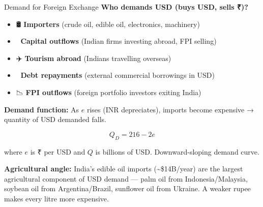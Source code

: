 \documentclass[
  ignorenonframetext,
  aspectratio=169,
]{beamer}
\makeatletter
\providecommand{\tightlist}{%
  \setlength{\itemsep}{0pt}\setlength{\parskip}{0pt}}
\let\quarto@originallabel\label
\DeclareRobustCommand*{\label}[1]{\quarto@originallabel{#1}}
\makeatother
\begin{document}
\begin{frame}{Demand for Foreign Exchange}
\label{demand-for-foreign-exchange}
\textbf{Who demands USD (buys USD, sells ₹)?}

\begin{itemize}
\tightlist
\item
  🛢️ \textbf{Importers} (crude oil, edible oil, electronics, machinery)
\item
  💸 \textbf{Capital outflows} (Indian firms investing abroad, FPI
  selling)
\item
  ✈️ \textbf{Tourism abroad} (Indians travelling overseas)
\item
  🏦 \textbf{Debt repayments} (external commercial borrowings in USD)
\item
  📉 \textbf{FPI outflows} (foreign portfolio investors exiting India)
\end{itemize}

\textbf{Demand function:} As \(e\) rises (INR depreciates), imports
become expensive → quantity of USD demanded falls.

\[Q_D = 216 - 2e\]

where \(e\) is ₹ per USD and \(Q\) is billions of USD. Downward-sloping
demand curve.

\textbf{Agricultural angle:} India's edible oil imports
(\textasciitilde\$14B/year) are the largest agricultural component of
USD demand --- palm oil from Indonesia/Malaysia, soybean oil from
Argentina/Brazil, sunflower oil from Ukraine. A weaker rupee makes every
litre more expensive.
\end{frame}
\end{document}
